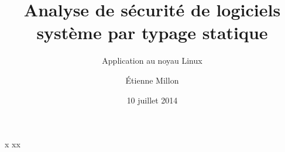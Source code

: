 \documentclass{beamer}
\title{Analyse de sécurité de logiciels système par typage statique}
\subtitle{Application au noyau Linux}
\author{Étienne Millon}
\date{10 juillet 2014}
\begin{document}
\frame{\titlepage}
\begin{frame}{}
    \begin{block}{x}
    xx
    \end{block}
\end{frame}{}
\end{document}

